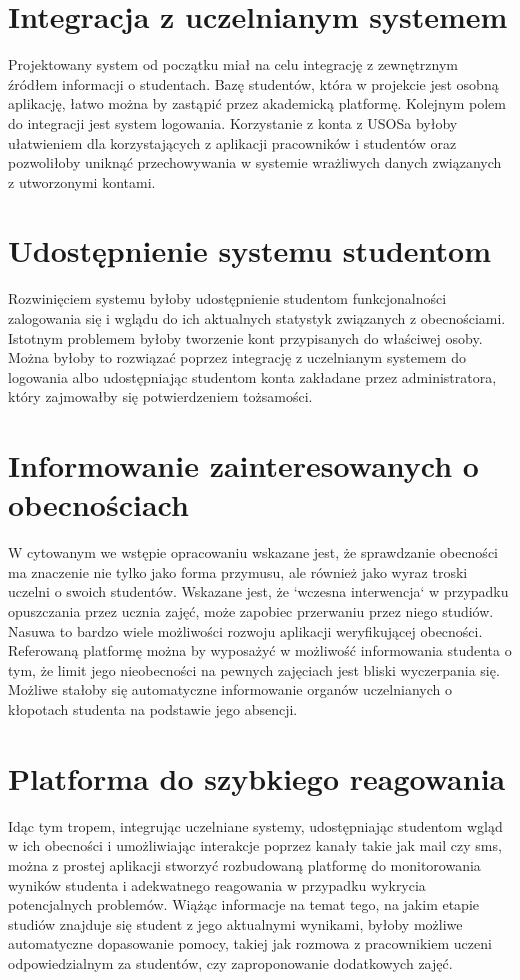 \documentclass[declaration,shortabstract, mgr]{iithesis}
\begin{document}
\section{Integracja z uczelnianym systemem}
\indent Projektowany system od początku miał na celu integrację z zewnętrznym źródłem informacji o studentach. Bazę studentów, która w projekcie jest osobną aplikację, łatwo można by zastąpić przez akademicką platformę. Kolejnym polem do integracji jest system logowania. Korzystanie z konta z USOSa byłoby ułatwieniem dla korzystających z aplikacji pracowników i studentów oraz pozwoliłoby uniknąć przechowywania w systemie wrażliwych danych związanych z utworzonymi kontami.
\section{Udostępnienie systemu studentom}
\indent Rozwinięciem systemu byłoby udostępnienie studentom funkcjonalności zalogowania się i wglądu do ich aktualnych statystyk związanych z obecnościami. Istotnym problemem byłoby tworzenie kont przypisanych do właściwej osoby. Można byłoby to rozwiązać poprzez integrację z uczelnianym systemem do logowania albo udostępniając studentom konta zakładane przez administratora, który zajmowałby się potwierdzeniem tożsamości.
\section{Informowanie zainteresowanych o obecnościach}
\indent W cytowanym we wstępie opracowaniu \cite{theory_base} wskazane jest, że sprawdzanie obecności ma znaczenie nie tylko jako forma przymusu, ale również jako wyraz troski uczelni o swoich studentów. Wskazane jest, że `wczesna interwencja` w przypadku opuszczania przez ucznia zajęć, może zapobiec przerwaniu przez niego studiów. Nasuwa to bardzo wiele możliwości rozwoju aplikacji weryfikującej obecności. Referowaną platformę można by wyposażyć w możliwość informowania studenta o tym, że limit jego nieobecności na pewnych zajęciach jest bliski wyczerpania się. \\
\indent Możliwe stałoby się automatyczne informowanie organów uczelnianych o kłopotach studenta na podstawie jego absencji. \\
\section{Platforma do szybkiego reagowania}
\indent Idąc tym tropem, integrując uczelniane systemy, udostępniając studentom wgląd w ich obecności i umożliwiając interakcje poprzez kanały takie jak mail czy sms, można z prostej aplikacji stworzyć rozbudowaną platformę do monitorowania wyników studenta i adekwatnego reagowania w przypadku wykrycia potencjalnych problemów. Wiążąc informacje na temat tego, na jakim etapie studiów znajduje się student z jego aktualnymi wynikami, byłoby możliwe automatyczne dopasowanie pomocy, takiej jak rozmowa z pracownikiem uczeni odpowiedzialnym za studentów, czy zaproponowanie dodatkowych zajęć.
\end{document}
